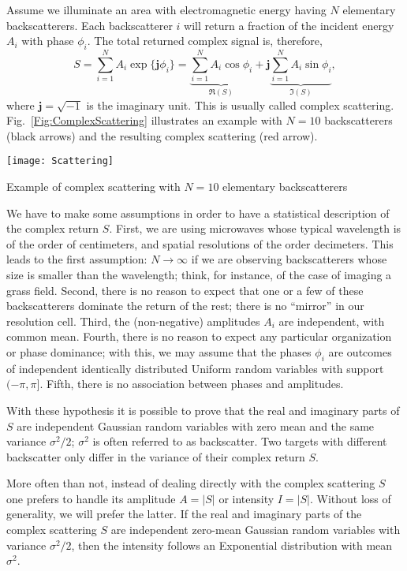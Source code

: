 Assume we illuminate an area with electromagnetic energy having $N$ elementary backscatterers.
Each backscatterer $i$ will return a fraction of the incident energy $A_i$ with phase $\phi_i$.
The total returned complex signal is, therefore,
\begin{equation}
S = \sum_{i=1}^{N} A_i \exp\{\mathbf j \phi_i\} = 
\underbrace{{\sum_{i=1}^{N} A_i \cos \phi_i}}_{\Re(S)} +\mathbf j \underbrace{ \sum_{i=1}^{N} A_i \sin \phi_i}_{\Im(S)}, 
\label{Eq:ComplexBackscatter}
\end{equation}
where $\mathbf j=\sqrt{-1}$ is the imaginary unit.
This is usually called complex scattering.
Fig.~\ref{Fig:ComplexScattering} illustrates an example with $N=10$ backscatterers (black arrows) and the resulting complex scattering (red arrow).

\begin{marginfigure}
\texttt{[image: Scattering]}
\caption{Example of complex scattering with $N=10$ elementary backscatterers}\label{Fig:ComplexScattering}
\end{marginfigure}

We have to make some assumptions in order to have a statistical description of the complex return $S$.
First, we are using microwaves whose typical wavelength is of the order of centimeters, and spatial resolutions of the order decimeters.
This leads to the first assumption: $N\to\infty$ if we are observing backscatterers whose size is smaller than the wavelength; think, for instance, of the case of imaging a grass field.
Second, there is no reason to expect that one or a few of these backscatterers dominate the return of the rest; there is no ``mirror'' in our resolution cell.
Third, the (non-negative) amplitudes $A_i$ are independent, with common mean.
Fourth, there is no reason to expect any particular organization or phase dominance; with this, we may assume that the phases $\phi_i$ are outcomes of independent identically distributed Uniform random variables with support $(-\pi,\pi]$.
Fifth, there is no association between phases and amplitudes.

With these hypothesis it is possible to prove that the real and imaginary parts of $S$ are independent Gaussian random variables with zero mean and the same variance $\sigma^2/2$; $\sigma^2$ is often referred to as backscatter.
Two targets with different backscatter only differ in the variance of their complex return $S$.

More often than not, instead of dealing directly with the complex scattering $S$ one prefers to handle its amplitude $A=|S|$ or intensity $I=|S|$.
Without loss of generality, we will prefer the latter.
If the real and imaginary parts of the complex scattering $S$ are independent zero-mean Gaussian random variables with variance $\sigma^2/2$, then the intensity follows an Exponential distribution with mean $\sigma^2$.

